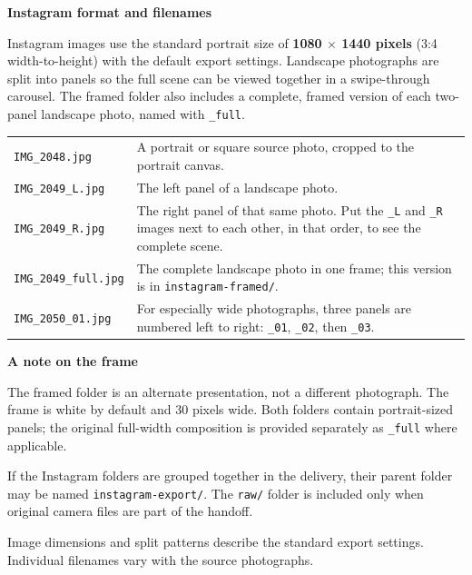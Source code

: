 \documentclass[10pt]{article}
\begin{document}
\vspace{12pt}
{\large\bfseries Instagram format and filenames}\par
Instagram images use the standard portrait size of \textbf{1080 $\times$ 1440 pixels} (3:4 width-to-height) with the default export settings. Landscape photographs are split into panels so the full scene can be viewed together in a swipe-through carousel. The framed folder also includes a complete, framed version of each two-panel landscape photo, named with \texttt{\_full}.\par
\vspace{3pt}
\begin{tabularx}{\textwidth}{>{\ttfamily}p{} X}
\rowcolor{mist}\textnormal{\texttt{IMG\_2048.jpg}} & A portrait or square source photo, cropped to the portrait canvas.\\
\texttt{IMG\_2049\_L.jpg} & The left panel of a landscape photo.\\
\texttt{IMG\_2049\_R.jpg} & The right panel of that same photo. Put the \texttt{\_L} and \texttt{\_R} images next to each other, in that order, to see the complete scene.\\
\texttt{IMG\_2049\_full.jpg} & The complete landscape photo in one frame; this version is in \texttt{instagram-framed/}.\\
\texttt{IMG\_2050\_01.jpg} & For especially wide photographs, three panels are numbered left to right: \texttt{\_01}, \texttt{\_02}, then \texttt{\_03}.\\
\end{tabularx}

\vspace{12pt}
\colorbox{mist}{\parbox{\dimexpr\textwidth-2\fboxsep\relax}{%
{\large\bfseries\color{accent}A note on the frame}\par
The framed folder is an alternate presentation, not a different photograph. The frame is white by default and 30 pixels wide. Both folders contain portrait-sized panels; the original full-width composition is provided separately as \texttt{\_full} where applicable.
}}

\vspace{12pt}
If the Instagram folders are grouped together in the delivery, their parent folder may be named \texttt{instagram-export/}. The \texttt{raw/} folder is included only when original camera files are part of the handoff.

\vfill
{\small\color{muted}Image dimensions and split patterns describe the standard export settings. Individual filenames vary with the source photographs.}
\end{document}
